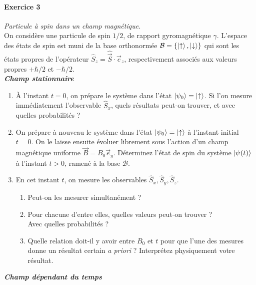\newpage
\paragraph{Exercice 3} \textit{Particule à spin dans un champ magnétique.} \\
On considère une particule de spin $1/2$, de rapport gyromagnétique $\gamma$. L'espace des états de spin est muni de la base orthonormée $\mathcal{B} = \lbrace \ket{\uparrow},\ket{\downarrow}\rbrace$ qui sont les états propres de l'opérateur $\hat S_z = \hat{\vec S}\cdot \vec e_z$, respectivement associés aux valeurs propres $+\hbar/2$ et $-\hbar/2$.\\

\textbf{\textit{Champ stationnaire}}
\begin{enumerate}
\item À l'instant $t=0$, on prépare le système dans l'état $\ket{\psi_0} = \ket{\uparrow}$. Si l'on mesure immédiatement l'observable $\hat S_x$, quels résultats peut-on trouver, et avec quelles probabilités ?
\item On prépare à nouveau le système dans l'état $\ket{\psi_0} = \ket{\uparrow}$ à l'instant initial $t=0$. On le laisse ensuite évoluer librement sous l'action d'un champ magnétique uniforme $\vec B = B_0 \vec e_y$. Déterminez l'état de spin du système $\ket{\psi(t)}$ à l'instant $t>0$, ramené à la base $\mathcal{B}$.
\item En cet instant $t$, on mesure les observables $\hat S_x,\hat S_y,\hat S_z$. 
\begin{enumerate}
\item Peut-on les mesurer simultanément ?
\item Pour chacune d'entre elles, quelles valeurs peut-on trouver ? \\
Avec quelles probabilités ?
\item Quelle relation doit-il y avoir entre $B_0$ et $t$ pour que l'une des mesures donne un résultat certain \textit{a priori} ? Interprétez physiquement votre résultat.
\end{enumerate}
\end{enumerate}
$ $\\
\textbf{\textit{Champ dépendant du temps}}
